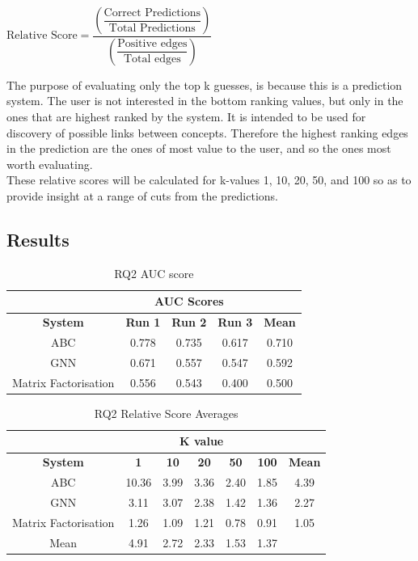 \documentclass{l4proj}
\begin{document}
\begin{center}
    $\text{Relative Score} = \dfrac{\left ( \dfrac{\text{Correct Predictions}}{\text{Total Predictions}}\right )}{\left ( \dfrac{\text{Positive edges}}{\text{Total edges}}\right )}$ 
\end{center}

The purpose of evaluating only the top k guesses, is because this is a prediction system. The user is not interested in the bottom ranking values, but only in the ones that are highest ranked by the system. It is intended to be used for discovery of possible links between concepts. Therefore the highest ranking edges in the prediction are the ones of most value to the user, and so the ones most worth evaluating. \\

These relative scores will be calculated for k-values 1, 10, 20, 50, and 100 so as to provide insight at a range of cuts from the predictions. \\

\subsection{Results}

\begin{table}[h]
    \centering
    \caption{RQ2 AUC score}
    \label{tab:rq2_auc}
    \begin{tabular}{|c|c|c|c|c|}
    \hline
    & \multicolumn{3}{|c|}{AUC Scores} & \\ \hline
    \textbf{System} & \textbf{Run 1} & \textbf{Run 2} & \textbf{Run 3} & \textbf{Mean}\\ \hline
    ABC & 0.778 & 0.735 & 0.617 & 0.710 \\ \hline
    GNN & 0.671 & 0.557 & 0.547 & 0.592 \\ \hline
    Matrix Factorisation & 0.556 & 0.543 & 0.400 & 0.500 \\ \hline
    \end{tabular}
\end{table}

\begin{table}[h]
    \centering
    \caption{RQ2 Relative Score Averages}
    \label{tab:rq2_rsa}
    \begin{tabular}{|c|c|c|c|c|c|c|}
    \hline
    & \multicolumn{5}{|c|}{K value} & \\ \hline
    \textbf{System} & \textbf{1} & \textbf{10} & \textbf{20} & \textbf{50} & \textbf{100} & \textbf{Mean}\\ \hline
    ABC & 10.36 & 3.99 & 3.36 & 2.40 & 1.85 & 4.39\\ \hline
    GNN & 3.11 & 3.07 & 2.38 & 1.42 & 1.36 & 2.27\\ \hline
    Matrix Factorisation & 1.26 & 1.09 & 1.21 & 0.78 & 0.91 & 1.05\\ \hline
    Mean & 4.91 & 2.72 & 2.33 & 1.53 & 1.37 & \\ \hline
    \end{tabular}
\end{table}
\end{document}
